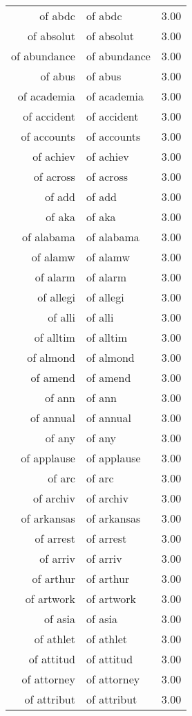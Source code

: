 \begin{table}[ht]
\begin{tabular}{rlr}
  of abdc & of abdc & 3.00 \\ 
  of absolut & of absolut & 3.00 \\ 
  of abundance & of abundance & 3.00 \\ 
  of abus & of abus & 3.00 \\ 
  of academia & of academia & 3.00 \\ 
  of accident & of accident & 3.00 \\ 
  of accounts & of accounts & 3.00 \\ 
  of achiev & of achiev & 3.00 \\ 
  of across & of across & 3.00 \\ 
  of add & of add & 3.00 \\ 
  of aka & of aka & 3.00 \\ 
  of alabama & of alabama & 3.00 \\ 
  of alamw & of alamw & 3.00 \\ 
  of alarm & of alarm & 3.00 \\ 
  of allegi & of allegi & 3.00 \\ 
  of alli & of alli & 3.00 \\ 
  of alltim & of alltim & 3.00 \\ 
  of almond & of almond & 3.00 \\ 
  of amend & of amend & 3.00 \\ 
  of ann & of ann & 3.00 \\ 
  of annual & of annual & 3.00 \\ 
  of any & of any & 3.00 \\ 
  of applause & of applause & 3.00 \\ 
  of arc & of arc & 3.00 \\ 
  of archiv & of archiv & 3.00 \\ 
  of arkansas & of arkansas & 3.00 \\ 
  of arrest & of arrest & 3.00 \\ 
  of arriv & of arriv & 3.00 \\ 
  of arthur & of arthur & 3.00 \\ 
  of artwork & of artwork & 3.00 \\ 
  of asia & of asia & 3.00 \\ 
  of athlet & of athlet & 3.00 \\ 
  of attitud & of attitud & 3.00 \\ 
  of attorney & of attorney & 3.00 \\ 
  of attribut & of attribut & 3.00 \\ 

\end{tabular}
\end{table}
